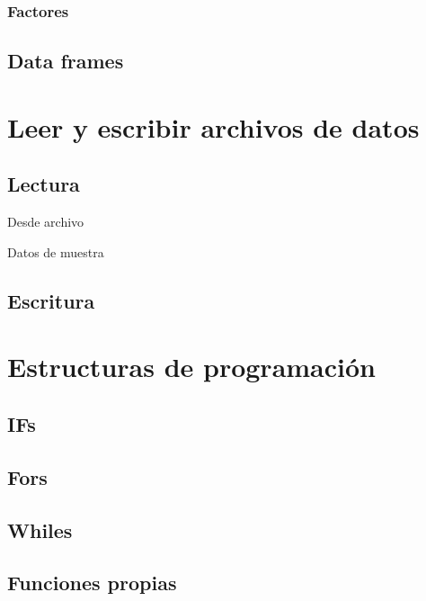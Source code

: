 \documentclass[]{article}
\begin{document}
\subsubsection{Factores}\label{factores}

\subsection{Data frames}\label{data-frames}

\section{Leer y escribir archivos de
datos}\label{leer-y-escribir-archivos-de-datos}

\subsection{Lectura}\label{lectura}

Desde archivo

Datos de muestra

\subsection{Escritura}\label{escritura}

\section{Estructuras de programación}\label{estructuras-de-programacion}

\subsection{IFs}\label{ifs}

\subsection{Fors}\label{fors}

\subsection{Whiles}\label{whiles}

\subsection{Funciones propias}\label{funciones-propias}

\printbibliography
\end{document}
